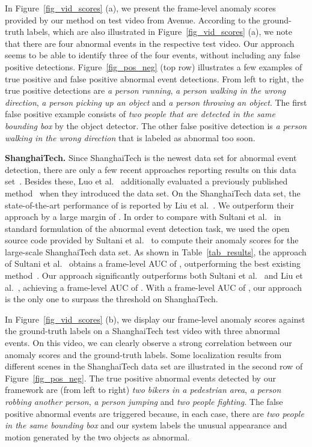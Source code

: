 \documentclass[10pt,twocolumn,letterpaper]{article}
\begin{document}
In Figure~\ref{fig_vid_scores} (a), we present the frame-level anomaly scores provided by our method on test video  from Avenue. According to the ground-truth labels, which are also illustrated in Figure~\ref{fig_vid_scores} (a), we note that there are four abnormal events in the respective test video. Our approach seems to be able to identify three of the four events, without including any false positive detections. Figure~\ref{fig_pos_neg} (top row) illustrates a few examples of true positive and false positive abnormal event detections. From left to right, the true positive detections are \emph{a person running}, \emph{a person walking in the wrong direction}, \emph{a person picking up an object} and \emph{a person throwing an object}. The first false positive example consists of \emph{two people that are detected in the same bounding box} by the object detector. The other false positive detection is \emph{a person walking in the wrong direction} that is labeled as abnormal too soon.

\noindent
{\bf ShanghaiTech.}
Since ShanghaiTech is the newest data set for abnormal event detection, there are only a few recent approaches reporting results on this data set~\cite{Liu-CVPR-2018,Luo-ICCV-2017}. Besides these, Luo et al.~\cite{Luo-ICCV-2017} additionally evaluated a previously published method~\cite{Hasan-CVPR-2016} when they introduced the data set. On the ShanghaiTech data set, the state-of-the-art performance of  is reported by Liu et al.~\cite{Liu-CVPR-2018}. We outperform their approach by a large margin of . In order to compare with Sultani et al.~\cite{Sultani-CVPR-2018} in standard formulation of the abnormal event detection task, we used the open source code provided by Sultani et al.~\cite{Sultani-CVPR-2018} to compute their anomaly scores for the large-scale ShanghaiTech data set. As shown in Table~\ref{tab_results}, the approach of Sultani et al.~\cite{Sultani-CVPR-2018} obtains a frame-level AUC of , outperforming the best existing method~\cite{Liu-CVPR-2018}. Our approach significantly outperforms both Sultani et al.~\cite{Sultani-CVPR-2018} and Liu et al.~\cite{Liu-CVPR-2018}, achieving a frame-level AUC of . With a frame-level AUC of , our approach is the only one to surpass the  threshold on ShanghaiTech.

In Figure~\ref{fig_vid_scores} (b), we display our frame-level anomaly scores against the ground-truth labels on a ShanghaiTech test video with three abnormal events. On this video, we can clearly observe a strong correlation between our anomaly scores and the ground-truth labels. Some localization results from different scenes in the ShanghaiTech data set are illustrated in the second row of Figure~\ref{fig_pos_neg}. The true positive abnormal events detected by our framework are (from left to right) \emph{two bikers in a pedestrian area}, \emph{a person robbing another person}, \emph{a person jumping} and \emph{two people fighting}. The false positive abnormal events are triggered because, in each case, there are \emph{two people in the same bounding box} and our system labels the unusual appearance and motion generated by the two objects as abnormal.
\end{document}
